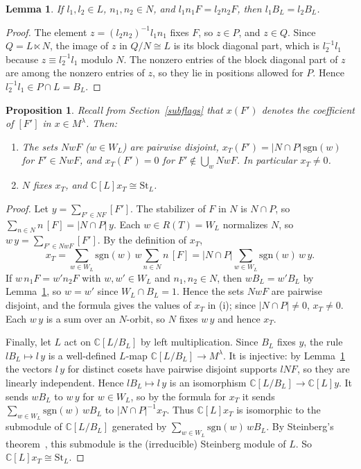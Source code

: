 \documentclass[11pt, letterpaper]{amsart}
\newtheorem{proposition}{Proposition}
\newtheorem{lemma}{Lemma}
\theoremstyle{definition}
\theoremstyle{remark}
\newcommand{\CC}{\mathbb{C}}
\newcommand{\sgn}{\mathrm{sgn}}
\newcommand{\St}{\mathrm{St}}
\begin{document}
\begin{lemma}\label{lemfact}
If $l_1,l_2\in L$, $n_1,n_2\in N$, and $l_1n_1F=l_2n_2F$, then $l_1B_L=l_2B_L$.
\end{lemma}
\begin{proof}
The element $z=(l_2n_2)^{-1}l_1n_1$ fixes $F$, so $z\in P$, and $z\in Q$. Since $Q=L\ltimes N$, the image of $z$ in $Q/N\cong L$ is its block diagonal part, which is $l_2^{-1}l_1$ because $z\equiv l_2^{-1}l_1$ modulo $N$. The nonzero entries of the block diagonal part of $z$ are among the nonzero entries of $z$, so they lie in positions allowed for $P$. Hence $l_2^{-1}l_1\in P\cap L=B_L$.
\end{proof}

\begin{proposition}\label{propstpull}
Recall from Section~\ref{subflags} that $x(F')$ denotes the coefficient of $[F']$ in $x\in M^\lambda$. Then:
\begin{enumerate}
\item[(i)] The sets $NwF$ ($w\in W_L$) are pairwise disjoint, $x_T(F')=|N\cap P|\,\sgn(w)$ for $F'\in NwF$, and $x_T(F')=0$ for $F'\notin\bigcup_wNwF$. In particular $x_T\ne0$.
\item[(ii)] $N$ fixes $x_T$, and $\CC[L]x_T\cong\St_L$.
\end{enumerate}
\end{proposition}
\begin{proof}
Let $y=\sum_{F'\in NF}[F']$. The stabilizer of $F$ in $N$ is $N\cap P$, so $\sum_{n\in N}n\,[F]=|N\cap P|\,y$. Each $w\in R(T)=W_L$ normalizes $N$, so $w\,y=\sum_{F'\in NwF}[F']$. By the definition of $x_T$,
\[
x_T=\sum_{w\in W_L}\sgn(w)\,w\sum_{n\in N}n\,[F]=|N\cap P|\sum_{w\in W_L}\sgn(w)\,w\,y.
\]
If $w\,n_1F=w'n_2F$ with $w,w'\in W_L$ and $n_1,n_2\in N$, then $wB_L=w'B_L$ by Lemma~\ref{lemfact}, so $w=w'$ since $W_L\cap B_L=1$. Hence the sets $NwF$ are pairwise disjoint, and the formula gives the values of $x_T$ in (i); since $|N\cap P|\ne0$, $x_T\ne0$. Each $w\,y$ is a sum over an $N$-orbit, so $N$ fixes $w\,y$ and hence $x_T$.

Finally, let $L$ act on $\CC[L/B_L]$ by left multiplication. Since $B_L$ fixes $y$, the rule $lB_L\mapsto l\,y$ is a well-defined $L$-map $\CC[L/B_L]\to M^\lambda$. It is injective: by Lemma~\ref{lemfact} the vectors $l\,y$ for distinct cosets have pairwise disjoint supports $lNF$, so they are linearly independent. Hence $lB_L\mapsto l\,y$ is an isomorphism $\CC[L/B_L]\to\CC[L]y$. It sends $wB_L$ to $w\,y$ for $w\in W_L$, so by the formula for $x_T$ it sends $\sum_{w\in W_L}\sgn(w)\,wB_L$ to $|N\cap P|^{-1}x_T$. Thus $\CC[L]x_T$ is isomorphic to the submodule of $\CC[L/B_L]$ generated by $\sum_{w\in W_L}\sgn(w)\,wB_L$. By Steinberg's theorem~\cite{St}, this submodule is the (irreducible) Steinberg module of $L$. So $\CC[L]x_T\cong\St_L$.
\end{proof}
\end{document}
